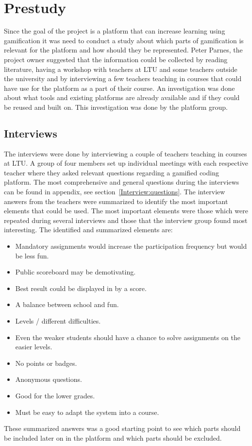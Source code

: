 \chapter{Prestudy} 
Since the goal of the project is a platform that can increase learning using gamification it was need to conduct a study about which parts of gamification is relevant for the platform and how should they be represented. Peter Parnes, the project owner suggested that the information could be collected by reading literature, having a workshop with teachers at LTU and some teachers outside the university and by interviewing a few teachers teaching in courses that could have use for the platform as a part of their course. An investigation was done about what tools and existing platforms are already available and if they could be reused and built on. This investigation was done by the platform group.

\section{Interviews}
The interviews were done by interviewing a couple of teachers teaching in courses at LTU. A group of four members set up individual meetings with each respective teacher where they asked relevant questions regarding a gamified coding platform. The most comprehensive and general questions during the interviews can be found in appendix, see section~\ref{Interview:questions}. The interview answers from the teachers were summarized to identify the most important elements that could be used. The most important elements were those which were repeated during several interviews and those that the interview group found most interesting. The identified and summarized elements are:

 \begin{itemize}
 \item Mandatory assignments would increase the participation frequency but would be less fun.
 \item Public scoreboard may be demotivating.
 \item Best result could be displayed in by a score.
 \item A balance between school and fun.
 \item Levels / different difficulties. 
 \item Even the weaker students should have a chance to solve assignments on the easier levels.
 \item No points or badges.
 \item Anonymous questions.
 \item Good for the lower grades.
 \item Must be easy to adapt the system into a course.
 \end{itemize}
These summarized answers was a good starting point to see which parts should be included later on in the platform and which parts should be excluded. 

